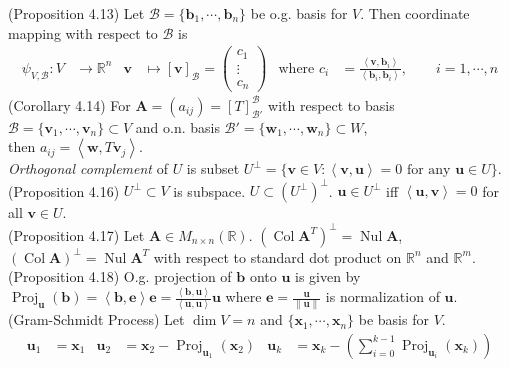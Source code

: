 \documentclass{article}
\theoremstyle{definition}
\DeclareMathOperator{\Nul}{Nul}
\DeclareMathOperator{\Col}{Col}
\DeclareMathOperator{\Proj}{Proj}
\begin{document}
(Proposition 4.13) Let $\mathcal{B}=\{\mathbf{b}_{1},\cdots,\mathbf{b}_{n}\}$ be o.g. basis for $V$. Then coordinate mapping with respect to $\mathcal{B}$ is
\begin{align*}
    \psi_{V,\mathcal{B}}:V&\rightarrow\mathbb{R}^{n} & \mathbf{v}&\mapsto\left[\mathbf{v}\right]_{\mathcal{B}}=\begin{pmatrix}
        c_{1}\\
        \vdots\\
        c_{n}
    \end{pmatrix} & \text{where }c_{i}&=\frac{\left<\mathbf{v},\mathbf{b}_{i}\right>}{\left<\mathbf{b}_{i},\mathbf{b}_{i}\right>},\qquad i=1,\cdots,n
\end{align*}
(Corollary 4.14) For $\mathbf{A}=(a_{ij})=\left[T\right]_{\mathcal{B}'}^{\mathcal{B}}$ with respect to basis $\mathcal{B}=\{\mathbf{v}_{1},\cdots,\mathbf{v}_{n}\}\subset V$ and o.n. basis $\mathcal{B}'=\{\mathbf{w}_{1},\cdots,\mathbf{w}_{n}\}\subset W$,\\
then $a_{ij}=\left<\mathbf{w},T\mathbf{v}_{j}\right>$.\\
\textit{Orthogonal complement} of $U$ is subset $U^{\perp}=\{\mathbf{v}\in V:\left<\mathbf{v},\mathbf{u}\right>=0\text{ for any }\mathbf{u}\in U\}$.\\
(Proposition 4.16) $U^{\perp}\subset V$ is subspace. $U\subset(U^{\perp})^{\perp}$. $\mathbf{u}\in U^{\perp}$ iff $\left<\mathbf{u},\mathbf{v}\right>=0$ for all $\mathbf{v}\in U$.\\
(Proposition 4.17) Let $\mathbf{A}\in M_{n\times n}(\mathbb{R})$. $(\Col\mathbf{A}^{T})^{\perp}=\Nul\mathbf{A}$,  $(\Col\mathbf{A})^{\perp}=\Nul\mathbf{A}^{T}$ with respect to standard dot product on $\mathbb{R}^{n}$ and $\mathbb{R}^{m}$.\\
(Proposition 4.18) O.g. projection of $\mathbf{b}$ onto $\mathbf{u}$ is given by $\Proj_{\mathbf{u}}(\mathbf{b})=\left<\mathbf{b},\mathbf{e}\right>\mathbf{e}=\frac{\left<\mathbf{b},\mathbf{u}\right>}{\left<\mathbf{u},\mathbf{u}\right>}\mathbf{u}$ where $\mathbf{e}=\frac{\mathbf{u}}{\lVert\mathbf{u}\rVert}$ is normalization of $\mathbf{u}$.\\
(Gram-Schmidt Process) Let $\dim V=n$ and $\{\mathbf{x}_{1},\cdots,\mathbf{x}_{n}\}$ be basis for $V$.
\begin{align*}
    \mathbf{u}_{1}&=\mathbf{x}_{1} & \mathbf{u}_{2}&=\mathbf{x}_{2}-\Proj_{\mathbf{u}_{1}}(\mathbf{x}_{2}) & \mathbf{u}_{k}&=\mathbf{x}_{k}-\left(\sum_{i=0}^{k-1}\Proj_{\mathbf{u}_{i}}(\mathbf{x}_{k})\right)
\end{align*}
\end{document}
